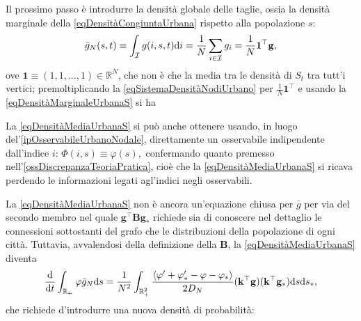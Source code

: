             Il prossimo passo è introdurre la densità globale delle taglie, ossia la densità marginale della \cref{eqDensitàCongiuntaUrbana} rispetto alla popolazione \(s\):
            \begin{equation}
                \label{eqDensitàMarginaleUrbanaS}
                \bar g_N(s,t)
                \equiv\int_{\mathcal I}g(i,s,t)\mathrm{d} i
                =\frac1N\sum_{i\in\mathcal I}g_i
                =\frac1N\mathbf 1^\top\mathbf g,
            \end{equation}
            ove \(\mathbf 1\equiv(1,1,\ldots,1)\in\mathbb R^N\), che non è che la media tra le densità di \(S_t\) tra tutt'i vertici\footnotemark{}; premoltiplicando la \cref{eqSistemaDensitàNodiUrbano} per \(\frac1N\mathbf 1^\top\) e usando la \cref{eqDensitàMarginaleUrbanaS} si ha%
 
            \begin{oss}
                La \ref{eqDensitàMediaUrbanaS} si può anche ottenere usando, in luogo del'\cref{ipOsservabileUrbanoNodale}, direttamente un osservabile indipendente dall'indice \(i\): \(\Phi(i,s)\equiv\varphi(s),\) confermando quanto premesso nell'\cref{ossDiscrepanzaTeoriaPratica}, cioè che la \ref{eqDensitàMediaUrbanaS} si ricava perdendo le informazioni legati agl'indici negli osservabili.
            \end{oss}

            La \ref{eqDensitàMediaUrbanaS} non è ancora un'equazione chiusa per \(\bar g\) per via del secondo membro nel quale \(\mathbf g^\top\mathbf B\mathbf g_*\) richiede sia di conoscere nel dettaglio le connessioni sottostanti del grafo che le distribuzioni della popolazione di ogni città. Tuttavia, avvalendosi della definizione della \(\mathbf B\), la \ref{eqDensitàMediaUrbanaS} diventa
            \begin{equation}
                \label{eqPrimaIntroduzioneDensitàGradi}
                \frac{\mathrm{d}}{\mathrm{d}t}\int_{\mathbb R_+}\varphi\bar g_N\mathrm{d} s=
                \frac1{N^2}\int_{\mathbb R_+^2}
                \frac{\langle\varphi'+\varphi'_*-\varphi-\varphi_*\rangle}{2D_N}
                (\mathbf k^\top\mathbf g)(\mathbf k^\top\mathbf g_*)\mathrm{d} s\mathrm{d} s_*,
            \end{equation}
            che richiede d'introdurre una nuova densità di probabilità:

